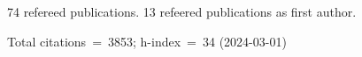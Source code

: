 74 refereed publications. 13 refeered publications as first author.

Total citations~=~3853; h-index~=~34 (2024-03-01)